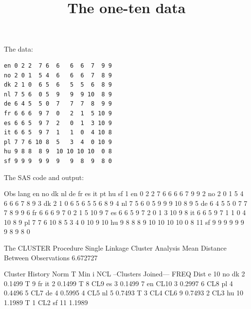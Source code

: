 \documentclass{article}
\title{The one-ten data}
\begin{document}
\maketitle
The data:
\begin{verbatim}
en 0 2 2  7 6  6   6  6  7  9 9
no 2 0 1  5 4  6   6  6  7  8 9
dk 2 1 0  6 5  6   5  5  6  8 9
nl 7 5 6  0 5  9   9  9 10  8 9
de 6 4 5  5 0  7   7  7  8  9 9
fr 6 6 6  9 7  0   2  1  5 10 9
es 6 6 5  9 7  2   0  1  3 10 9
it 6 6 5  9 7  1   1  0  4 10 8
pl 7 7 6 10 8  5   3  4  0 10 9
hu 9 8 8  8 9  10 10 10 10  0 8
sf 9 9 9  9 9  9   9  8  9  8 0
\end{verbatim}
The SAS code and output:
\begin{Woutput}
Obs    lang    en    no    dk    nl    de    fr    es    it    pt    hu    sf
  1     en      0     2     2     7     6     6     6     6     7     9     9
  2     no      2     0     1     5     4     6     6     6     7     8     9
  3     dk      2     1     0     6     5     6     5     5     6     8     9
  4     nl      7     5     6     0     5     9     9     9    10     8     9
  5     de      6     4     5     5     0     7     7     7     8     9     9
  6     fr      6     6     6     9     7     0     2     1     5    10     9
  7     es      6     6     5     9     7     2     0     1     3    10     9
  8     it      6     6     5     9     7     1     1     0     4    10     8
  9     pl      7     7     6    10     8     5     3     4     0    10     9
 10     hu      9     8     8     8     9    10    10    10    10     0     8
 11     sf      9     9     9     9     9     9     9     8     9     8     0

The CLUSTER Procedure
Single Linkage Cluster Analysis
Mean Distance Between Observations    6.672727

                    Cluster History
                                              Norm    T
                                               Min    i
   NCL    --Clusters Joined---      FREQ      Dist    e
    10    no          dk               2    0.1499    T
     9    fr          it               2    0.1499    T
     8    CL9         es               3    0.1499
     7    en          CL10             3    0.2997
     6    CL8         pl               4    0.4496
     5    CL7         de               4    0.5995
     4    CL5         nl               5    0.7493    T
     3    CL4         CL6              9    0.7493
     2    CL3         hu              10    1.1989    T
     1    CL2         sf              11    1.1989
\end{Woutput}
\end{document}
